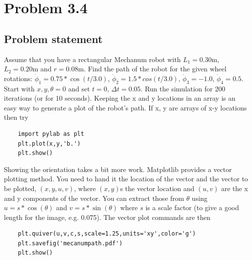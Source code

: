 \documentclass[letterpaper,11pt]{texMemo} %
\begin{document}
\maketitle %


\section*{Problem 3.4}
\subsection*{Problem statement}
Assume that you have a rectangular Mechanum robot with $L_1=0.30$m, $L_2=0.20$m and $r=0.08$m. Find the path of the robot
for the given wheel rotations: $\dot{\phi}_1 = 0.75*\cos(t/3.0)$, $\dot{\phi}_2 = 1.5*cos(t/3.0)$, $\dot{\phi}_3 = -1.0$, $\dot{\phi}_4 = 0.5$.
Start with $x, y, \theta = 0$ and set $t=0$, $\Delta t = 0.05$. Run the simulation for 200 iterations (or for 10 seconds).
Keeping the x and y locations in an array is an easy way to generate a plot of the robot’s path. If x, y are arrays of x-y
locations then try

\begin{tiny}
    \begin{lstlisting}
    import pylab as plt
    plt.plot(x,y,'b.')
    plt.show()
    \end{lstlisting}
\end{tiny}

Showing the orientation takes a bit more work. Matplotlib provides a vector plotting method. You need to hand it the location
of the vector and the vector to be plotted, $(x,y,u,v)$, where $(x,y)$s the vector location and $(u,v)$ are the x and y
components of the vector. You can extract those from $\theta$ using $u = s*\cos(\theta)$ and $v = s*\sin(\theta)$ where
$s$ is a scale factor (to give a good length for the image, e.g. 0.075). The vector plot commands are then

\begin{tiny}
    \begin{lstlisting}
    plt.quiver(u,v,c,s,scale=1.25,units='xy',color='g')
    plt.savefig('mecanumpath.pdf')
    plt.show()
    \end{lstlisting}
\end{tiny}
\end{document}
